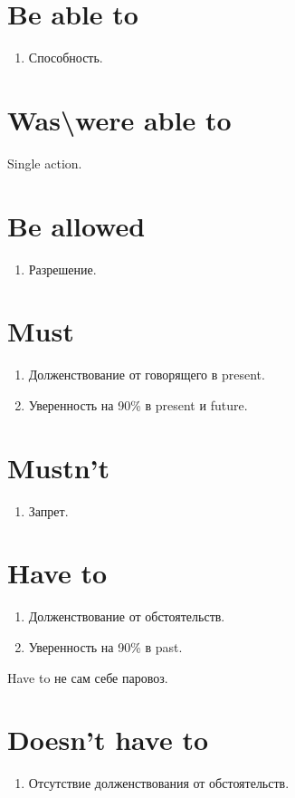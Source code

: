 \documentclass[oneside]{book}
\begin{document}
\section{Be able to}
\begin{enumerate}
    \item Способность.
\end{enumerate}

\section{Was\textbackslash were able to}
Single action.

\section{Be allowed}
\begin{enumerate}
    \item Разрешение.
\end{enumerate}

\section{Must}
\begin{enumerate}
    \item Долженствование от говорящего в present.
    \item Уверенность на 90\% в present и future.
\end{enumerate}

\section{Mustn't}
\begin{enumerate}
    \item Запрет.
\end{enumerate}

\section{Have to}
\begin{enumerate}
    \item Долженствование от обстоятельств.
    \item Уверенность на 90\% в past.
\end{enumerate}

Have to не сам себе паровоз.

\section{Doesn't have to}
\begin{enumerate}
    \item Отсутствие долженствования от обстоятельств.
\end{enumerate}
\end{document}
